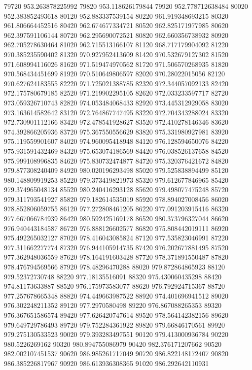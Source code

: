 {79720 953.263878225992
79820 953.118626179844
79920 952.778712638484
80020 952.383852493618
80120 952.883337539154
80220 961.919348693215
80320 961.806664452516
80420 962.674677334721
80520 962.825171977985
80620 962.397591106144
80720 962.295690072521
80820 962.660356738932
80920 962.705278630464
81020 962.715513166107
81120 968.717179904092
81220 970.385235590402
81320 970.927952413609
81420 970.532679127302
81520 971.608994116026
81620 971.519474970562
81720 971.506570268935
81820 970.568434451699
81920 970.510649806597
82020 970.28022015056
82120 970.627624183555
82220 971.725021388785
82320 972.344057092133
82420 972.175780679185
82520 971.219902295105
82620 972.033233597717
82720 973.059326710743
82820 974.053484068433
82920 973.445312929058
83020 973.163614582642
83120 972.764867747495
83220 972.704343288024
83320 972.730901112166
83420 972.478541928627
83520 972.410278146346
83620 974.392866205936
83720 975.367550556629
83820 975.331980927981
83920 975.119559901607
84020 974.960095418948
84120 976.128594650076
84220 975.931591432469
84320 975.653074186569
84420 976.038526137658
84520 975.999108996835
84620 975.830732474877
84720 975.320376421672
84820 979.877308240409
84920 980.020196293498
85020 979.525838894499
85120 980.148809919253
85220 979.373419821973
85320 979.612677846965
85420 979.374965048134
85520 980.240416293128
85620 979.498077475248
85720 979.311793541927
85820 979.182614535019
85920 978.894027008456
86020 978.852806059755
86120 977.272808461205
86220 977.091203915416
86320 977.667066784939
86420 980.592425169178
86520 980.373796327044
86620 976.940443184587
86720 976.888126602577
86820 975.808442019111
86920 975.492265032127
87020 978.416043085824
87120 977.535823046991
87220 977.311662277774
87320 976.944105914735
87420 976.202677881495
87520 977.362948036559
87620 978.164191603428
87720 978.371891550487
87820 978.476794569566
87920 978.48296470288
88020 979.872864865923
88120 979.52372730748
88220 977.18135516091
88320 975.430060435298
88420 974.81173633887
88520 976.175973583077
88620 976.792924715367
88720 977.257678665348
88820 974.449663987522
88920 974.401696941512
89020 976.302248211352
89120 977.2970580498
89220 976.867088265353
89320 976.367651586574
89420 977.626420747614
89520 978.564142382156
89620 979.649729786493
89720 979.752284361922
89820 979.66846170561
89920 979.275130533523
90020 979.393283497551
90120 979.413000936784
90220 980.5226269162
90320 980.894755086979
90420 982.376171207662
90520 982.002107451537
90620 986.985261717049
90720 986.822148172407
90820 986.385226817967
90920 986.613936308365
91020 986.292642110931
}
